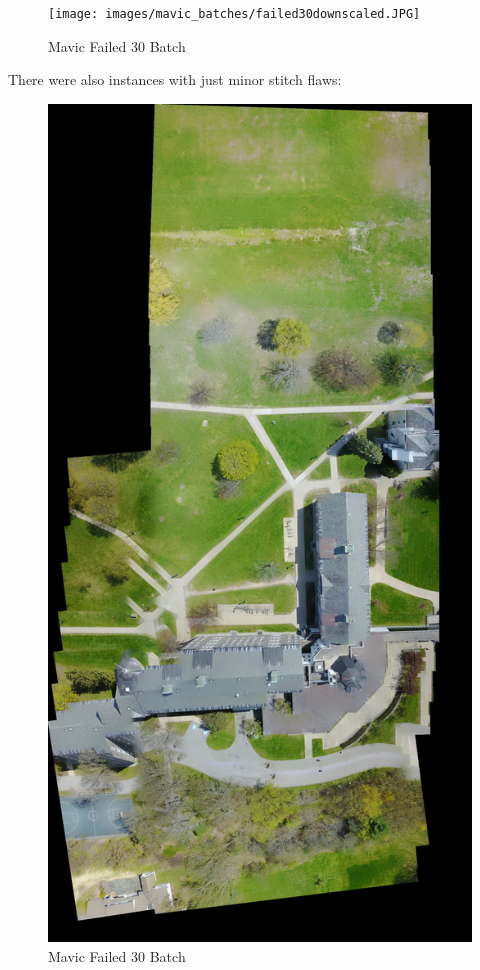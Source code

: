 \begin{figure}[htbp]
\centering
\texttt{[image: images/mavic\_batches/failed30downscaled.JPG]}
\caption{Mavic Failed 30 Batch}
\end{figure}

There were also instances with just minor stitch flaws:

\begin{figure}[htbp]
\centering
\includegraphics[keepaspectratio,width=\textwidth,height=0.75\textheight]{images/mavic_batches/minorfail30batch.JPG}
\caption{Mavic Failed 30 Batch}
\end{figure}

